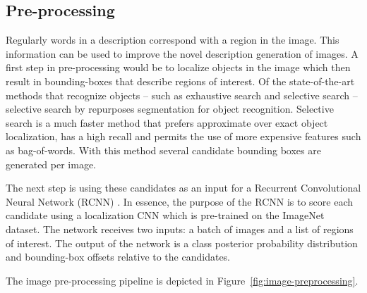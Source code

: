 \subsection{Pre-processing}
Regularly words in a description correspond with a region in the image. This information can be used to improve the novel description generation of images. A first step in pre-processing would be to localize objects in the image which then result in bounding-boxes that describe regions of interest. Of the state-of-the-art methods that recognize objects -- such as exhaustive search \cite{zhu2010latent, felzenszwalb2010object} and selective search \cite{Sande2011} -- selective search by \citeauthor{Sande2011} repurposes segmentation for object recognition. Selective search is a much faster method that prefers approximate over exact object localization, has a high recall and permits the use of more expensive features such as bag-of-words. With this method several candidate bounding boxes are generated per image.  

The next step is using these candidates as an input for a Recurrent Convolutional Neural Network (RCNN) \cite{girshick2015fast}. In essence, the purpose of the RCNN is to score each candidate using a  localization CNN which is pre-trained on the ImageNet dataset. The network receives two inputs: a batch of images and a list of regions of interest. The output of the network is a class posterior probability distribution and bounding-box offsets relative to the candidates.

The image pre-processing pipeline is depicted in Figure~\ref{fig:image-preprocessing}.

